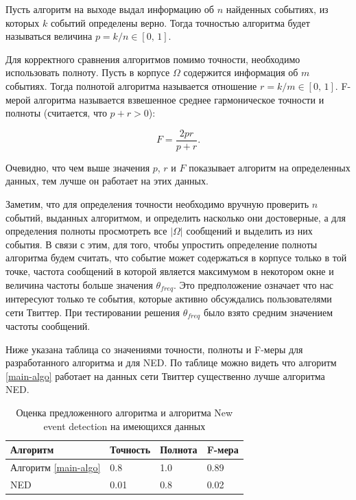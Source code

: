 \documentclass[14pt,a4paper,oneside]{extarticle}
\begin{document}
	Пусть алгоритм на выходе выдал информацию об $n$ найденных событиях, из которых $k$ событий определены верно. Тогда точностью алгоритма будет называться величина $p = k/n \in [0,\, 1]$. 
	
	Для корректного сравнения алгоритмов помимо точности, необходимо использовать полноту. Пусть в корпусе $\Omega$ содержится информация об $m$ событиях. Тогда полнотой алгоритма называется отношение $r = k/m \in [0,\, 1]$. F-мерой алгоритма называется взвешенное среднее гармоническое точности и полноты (считается, что $p + r > 0$):
	
	\begin{equation}
	F = \frac{2pr}{p + r}.
	\end{equation}
	
	Очевидно, что чем выше значения $p$, $r$ и $F$ показывает алгоритм на определенных данных, тем лучше он работает на этих данных.
	
	Заметим, что для определения точности необходимо вручную проверить $n$ событий, выданных алгоритмом, и определить насколько они достоверные, а для определения полноты просмотреть все $\vert \Omega \vert$ сообщений и выделить из них события. В связи с этим, для того, чтобы упростить определение полноты алгоритма будем считать, что событие может содержаться в корпусе только в той точке, частота сообщений в которой является максимумом в некотором окне и величина частоты больше значения $\theta_{freq}$. Это предположение означает что нас интересуют только те события, которые активно обсуждались пользователями сети Твиттер. При тестировании решения $\theta_{freq}$ было взято средним значением частоты сообщений.
	
	Ниже указана таблица со значениями точности, полноты и F-меры для разработанного алгоритма и для NED. По таблице можно видеть что алгоритм \ref{main-algo} работает на данных сети Твиттер существенно лучше алгоритма NED.
	
	\begin{table}[h]
	\centering
	\caption{Оценка предложенного алгоритма и алгоритма New event detection на имеющихся данных}
	\begin{tabular}{ l l l l}
	Алгоритм & Точность & Полнота & F-мера \\ \hline
	Алгоритм \ref{main-algo} & 0.8 & 1.0 & 0.89 \\ 
	NED & 0.01 & 0.8 & 0.02 \\ 
	\end{tabular}
	\end{table}
	
\end{document}
